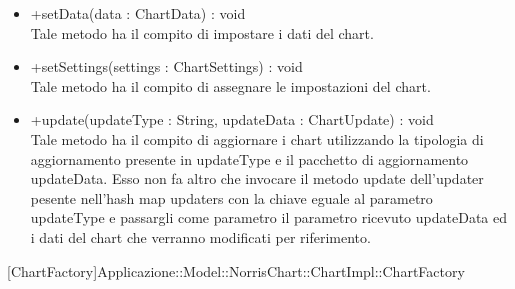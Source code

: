 \begin{itemize}
\begin{itemize}
					\item[\ding{111}] {{+setData(data : ChartData) : void}} \\ [1mm] Tale metodo ha il compito di impostare i dati del chart.
					\item[\ding{111}] {{+setSettings(settings : ChartSettings) : void}} \\ [1mm] Tale metodo ha il compito di assegnare le impostazioni del chart.
					\item[\ding{111}] {{+update(updateType : String, updateData : ChartUpdate) : void}} \\ [1mm] Tale metodo ha il compito di aggiornare i chart utilizzando la tipologia di aggiornamento presente in updateType e il pacchetto di aggiornamento updateData. Esso non fa altro che invocare il metodo update dell'updater pesente nell'hash map updaters con la chiave eguale al parametro updateType e passargli come parametro il parametro ricevuto updateData ed  i dati del chart che verranno modificati per riferimento.
				\end{itemize}
		
			\end{itemize}

			
			[ChartFactory]{Applicazione::Model::NorrisChart::ChartImpl::ChartFactory}
			

	

